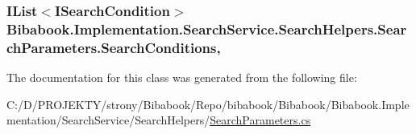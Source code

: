 \subsubsection[{Search\+Conditions}]{\setlength{\rightskip}{0pt plus 5cm}I\+List$<$I\+Search\+Condition$>$ Bibabook.\+Implementation.\+Search\+Service.\+Search\+Helpers.\+Search\+Parameters.\+Search\+Conditions\hspace{0.3cm}{\ttfamily [get]}, {\ttfamily [set]}}\label{class_bibabook_1_1_implementation_1_1_search_service_1_1_search_helpers_1_1_search_parameters_a413a985ac5992f1bb35aa0ea74ce80ab}


The documentation for this class was generated from the following file\+:\begin{DoxyCompactItemize}
\item 
C\+:/\+D/\+P\+R\+O\+J\+E\+K\+T\+Y/strony/\+Bibabook/\+Repo/bibabook/\+Bibabook/\+Bibabook.\+Implementation/\+Search\+Service/\+Search\+Helpers/\hyperlink{_search_parameters_8cs}{Search\+Parameters.\+cs}\end{DoxyCompactItemize}
